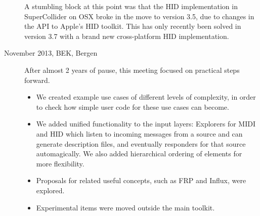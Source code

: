 \documentclass{article}
\begin{document}
\begin{description}
	A stumbling block at this point was that the HID implementation in SuperCollider on OSX broke in the move to version 3.5, due to changes in the API to Apple's HID toolkit. This has only recently been solved in version 3.7 with a brand new cross-platform HID implementation.
	
	\item[November 2013, BEK, Bergen] After almost 2 years of pause, this meeting focused on practical steps forward. 
	\begin{itemize}
		\item	We created example use cases of different levels of complexity, in order to check how simple user code for these use cases can become. 
		\item 	We added unified functionality to the input layers: Explorers for MIDI and HID which listen to incoming messages from a source and can generate description files, and eventually responders for that source automagically. We also added hierarchical ordering of elements for more flexibility. 
		\item 	Proposals for related useful concepts, such as FRP and Influx, were explored.
		\item	Experimental items were moved outside the main toolkit.
	\end{itemize}
		
		

\end{description}
\end{document}
